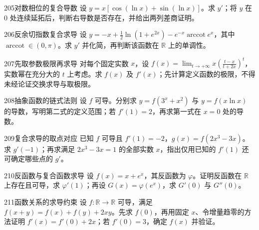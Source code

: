 \begin{exercise}{205}{对数相位的复合导数}
设 $y=x[\cos(\ln x)+\sin(\ln x)]$。求 $y'$；将 $y$ 在 $0$ 处连续延拓后，判断右导数是否存在，并给出两列差商证明。
\end{exercise}
\begin{exercise}{206}{反余切指数复合求导}
设 $y=-x+\frac12\ln(1+e^{2x})-e^{-x}\operatorname{arccot}e^x$，其中 $\operatorname{arccot}\in(0,\pi)$。求 $y'$ 并化简，再判断该函数在 $\mathbb R$ 上的单调性。
\end{exercise}
\begin{exercise}{207}{先取参数极限再求导}
对每个固定实数 $x$，设 $f(x)=\lim_{t\to+\infty}x\left(\frac{t-x}{t+2x}\right)^t$，实数幂在充分大的 $t$ 上考虑。求 $f(x)$ 及 $f'(x)$；先计算定义函数的极限，不得未经论证交换求导与取极限。
\end{exercise}
\begin{exercise}{208}{抽象函数的链式法则}
设 $f$ 可导。分别求 $y=f(3^x+x^2)$ 与 $y=f(x\ln x)$ 的导数，写明第二式的定义范围；若 $f'(1)=2$，再求第一式在 $x=0$ 处的导数。
\end{exercise}
\begin{exercise}{209}{复合求导的取点对应}
已知 $f$ 可导且 $f'(1)=-2$，$g(x)=f(2x^3-3x)$。求 $g'(-1)$；再求满足 $2x^3-3x=1$ 的全部实数 $x$，指出仅用已知的 $f'(1)$ 还可确定哪些点的 $g'$。
\end{exercise}
\begin{exercise}{210}{反函数与复合函数求导}
设 $f(x)=x+e^x$，其反函数为 $\varphi$。证明反函数在 $\mathbb R$ 上存在且可导，求 $\varphi'(1)$；再设 $G(x)=\varphi(e^x)$，求 $G'(0)$ 与 $G''(0)$。
\end{exercise}
\begin{exercise}{211}{函数关系的求导约束}
设 $f:\mathbb R\to\mathbb R$ 可导，满足 $f(x+y)=f(x)+f(y)+2xy$。先求 $f(0)$，再用固定 $x$、令增量趋零的方法证明 $f'(x)=f'(0)+2x$；若 $f'(0)=3$，确定 $f(x)$ 并验证。
\end{exercise}
